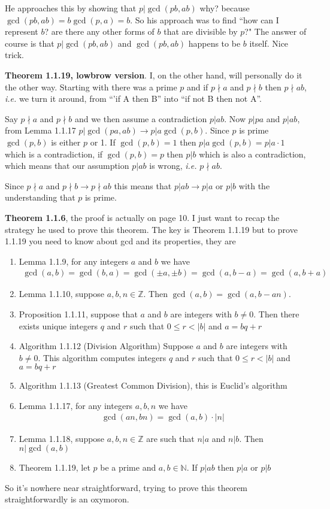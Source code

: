 \documentclass[aps,preprint,preprintnumbers,nofootinbib,showpacs,prd]{revtex4-1}
\newcommand{\ie}{{\it i.e.} }
\newcommand{\nbea}{\begin{eqnarray*}}
\newcommand{\neea}{\end{eqnarray*}}
\begin{document}
He approaches this by showing that $p|\gcd(pb, ab)$ why? because $\gcd(pb, ab) = b\gcd(p, a) = b$. So his approach was to find ``how can I represent $b$? are there any other forms of $b$ that are divisible by $p$?" The answer of course is that $p|\gcd(pb, ab)$ and $\gcd(pb, ab)$ happens to be $b$ itself. Nice trick.

{\bf Theorem 1.1.19, lowbrow version}. I, on the other hand, will personally do it the other way. Starting with there was a prime $p$ and if $p \nmid a$ and $p \nmid b$ then $p \nmid ab$, \ie we turn it around, from ``'if A then B'' into ``if not B then not A''.

Say $p \nmid a$ and $p \nmid b$ and we then assume a contradiction $p | ab$. Now $p | pa$ and $p | ab$, from Lemma 1.1.17 $p | \gcd(pa,ab) \to p | a \gcd (p,b)$. Since $p$ is prime $\gcd(p,b)$ is either $p$ or 1. If $\gcd(p,b) = 1$ then $p | a \gcd (p,b) = p|a \cdot 1$ which is a contradiction, if $\gcd(p,b) = p$ then $p|b$ which is also a contradiction, which means that our assumption $p|ab$ is wrong, \ie $p \nmid ab$.

Since $p \nmid a$ and $p \nmid b \longrightarrow p \nmid ab$ this means that $p|ab \longrightarrow p|a$ or $p|b$ with the understanding that $p$ is prime.


{\bf Theorem 1.1.6}, the proof is actually on page 10. I just want to recap the strategy he used to prove this theorem. The key is Theorem 1.1.19 but to prove 1.1.19 you need to know about gcd and its properties, they are
\begin{enumerate}
\item Lemma 1.1.9, for any integers $a$ and $b$ we have
%
\nbea
\gcd(a,b) = \gcd(b,a) = \gcd(\pm a,\pm b) = \gcd(a,b-a) = \gcd(a,b+a)
\neea
%
\item Lemma 1.1.10, suppose $a,b,n \in \mathbb{Z}$. Then $\gcd(a,b) = \gcd(a,b-an)$.
\item Proposition 1.1.11, suppose that $a$ and $b$ are integers with $b \neq 0$. Then there exists unique integers $q$ and $r$ such that $0 \le r < |b|$ and $a = bq + r$
\item Algorithm 1.1.12 (Division Algorithm) Suppose $a$ and $b$ are integers with $b \neq 0$. This algorithm computes integers $q$ and $r$ such that $0 \le r < |b|$ and $a = bq + r$
\item Algorithm 1.1.13 (Greatest Common Division), this is Euclid's algorithm
\item Lemma 1.1.17, for any integers $a,b,n$ we have
%
\nbea
\gcd(an,bn) = \gcd(a,b) \cdot |n|
\neea
%
\item Lemma 1.1.18, suppose $a,b,n \in \mathbb{Z}$ are such that $n|a$ and $n|b$. Then $n|\gcd(a,b)$
\item Theorem 1.1.19, let $p$ be a prime and $a,b \in \mathbb{N}$. If $p|ab$ then $p|a$ or $p|b$
\end{enumerate}
So it's nowhere near straightforward, trying to prove this theorem straightforwardly is an oxymoron.
\end{document}

